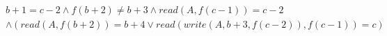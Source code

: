 \begin{align*}
%
& %
b + 1 = c - 2
%
\land
%
f(b + 2)  \neq  b + 3
%
\land
%
\mathit{read}(A,f(c - 1)) = c - 2
~\\~
& %
%
\land
%
(\mathit{read}(A,f(b + 2)) = b + 4 \lor \mathit{read}(\mathit{write}(A,b + 3,f(c - 2)),f(c - 1)) = c)
%
\end{align*}
